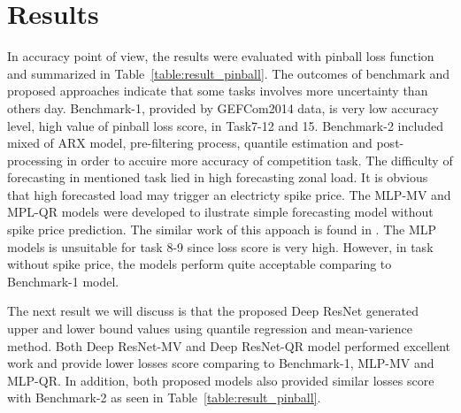 \documentclass[review]{elsarticle}
\begin{document}
  \section{Results}
    In accuracy point of view, the results were evaluated with pinball loss function and summarized in Table~\ref{table:result_pinball}.
    The outcomes of benchmark and proposed approaches indicate that some tasks involves more uncertainty than others day.
    Benchmark-1, provided by GEFCom2014 data, is very low accuracy level, high value of pinball loss score, in Task7-12 and 15.
    Benchmark-2 included mixed of ARX model, pre-filtering process, quantile estimation and post-processing in order to accuire more accuracy of competition task.
    The difficulty of forecasting in mentioned task lied in high forecasting zonal load.
    It is obvious that high forecasted load may trigger an electricty spike price.
    The MLP-MV and MPL-QR models were developed to ilustrate simple forecasting model without spike price prediction.
    The similar work of this appoach is found in \cite{Dudek2016}.
    The MLP models is unsuitable for task 8-9 since loss score is very high.
    However, in task without spike price, the models perform quite acceptable comparing to Benchmark-1 model.

    The next result we will discuss is that the proposed Deep ResNet generated upper and lower bound values using quantile regression and mean-varience method.
    Both Deep ResNet-MV and Deep ResNet-QR model performed excellent work and provide lower losses score comparing to Benchmark-1, MLP-MV and MLP-QR.
    In addition, both proposed models also provided similar losses score with Benchmark-2 as seen in Table~\ref{table:result_pinball}.
\end{document}
